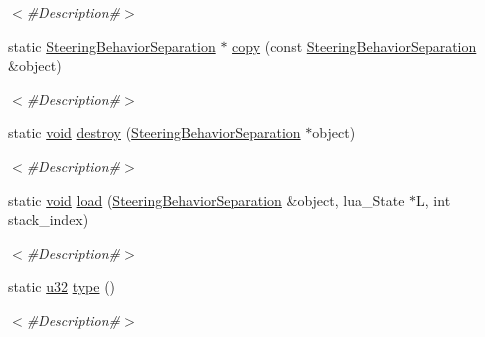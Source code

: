 \begin{DoxyCompactItemize}
\begin{DoxyCompactList}\small\item\em $<$\#\+Description\#$>$ \end{DoxyCompactList}\item 
static \mbox{\hyperlink{classnjli_1_1_steering_behavior_separation}{Steering\+Behavior\+Separation}} $\ast$ \mbox{\hyperlink{classnjli_1_1_steering_behavior_separation_a8156a2c0a0ad40dba25f82d3cd1afea9}{copy}} (const \mbox{\hyperlink{classnjli_1_1_steering_behavior_separation}{Steering\+Behavior\+Separation}} \&object)
\begin{DoxyCompactList}\small\item\em $<$\#\+Description\#$>$ \end{DoxyCompactList}\item 
static \mbox{\hyperlink{_thread_8h_af1e856da2e658414cb2456cb6f7ebc66}{void}} \mbox{\hyperlink{classnjli_1_1_steering_behavior_separation_a428498bb04b212eda0dddf634004121d}{destroy}} (\mbox{\hyperlink{classnjli_1_1_steering_behavior_separation}{Steering\+Behavior\+Separation}} $\ast$object)
\begin{DoxyCompactList}\small\item\em $<$\#\+Description\#$>$ \end{DoxyCompactList}\item 
static \mbox{\hyperlink{_thread_8h_af1e856da2e658414cb2456cb6f7ebc66}{void}} \mbox{\hyperlink{classnjli_1_1_steering_behavior_separation_ae6d57ed70a1c86a82bacc4adccc6fddd}{load}} (\mbox{\hyperlink{classnjli_1_1_steering_behavior_separation}{Steering\+Behavior\+Separation}} \&object, lua\+\_\+\+State $\ast$L, int stack\+\_\+index)
\begin{DoxyCompactList}\small\item\em $<$\#\+Description\#$>$ \end{DoxyCompactList}\item 
static \mbox{\hyperlink{_util_8h_a10e94b422ef0c20dcdec20d31a1f5049}{u32}} \mbox{\hyperlink{classnjli_1_1_steering_behavior_separation_ab8ccfe7e3fd366d5e3d5dd4786cc2736}{type}} ()
\begin{DoxyCompactList}\small\item\em $<$\#\+Description\#$>$ \end{DoxyCompactList}\end{DoxyCompactItemize}
